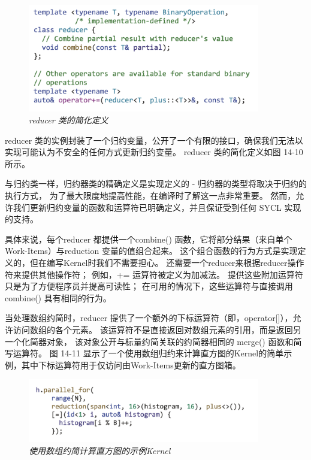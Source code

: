 \begin{figure}[H]
	\centering
	\includegraphics[width=0.9\textwidth]{figs/F14.10.png}
	\caption{\textit{reducer 类的简化定义 }}
\end{figure}

reducer 类的实例封装了一个归约变量，公开了一个有限的接口，确保我们无法以实现可能认为不安全的任何方式更新归约变量。 
reducer 类的简化定义如图 14-10 所示。

与归约类一样，归约器类的精确定义是实现定义的 - 归约器的类型将取决于归约的执行方式，
为了最大限度地提高性能，在编译时了解这一点非常重要。 
然而，允许我们更新归约变量的函数和运算符已明确定义，并且保证受到任何 SYCL 实现的支持。

具体来说，每个reducer 都提供一个combine() 函数，它将部分结果（来自单个Work-Items）与reduction 变量的值组合起来。 
这个组合函数的行为方式是实现定义的，但在编写Kernel时我们不需要担心。 
还需要一个reducer来根据reducer操作符来提供其他操作符； 
例如，+= 运算符被定义为加减法。 提供这些附加运算符只是为了方便程序员并提高可读性； 
在可用的情况下，这些运算符与直接调用combine() 具有相同的行为。

当处理数组约简时，reducer 提供了一个额外的下标运算符（即，operator[]），允许访问数组的各个元素。 
该运算符不是直接返回对数组元素的引用，而是返回另一个化简器对象，
该对象公开与标量约简关联的约简器相同的 merge() 函数和简写运算符。 
图 14-11 显示了一个使用数组归约来计算直方图的Kernel的简单示例，其中下标运算符用于仅访问由Work-Items更新的直方图箱。

\begin{figure}[H]
	\centering
	\includegraphics[width=0.9\textwidth]{figs/F14.11.png}
	\caption{\textit{使用数组约简计算直方图的示例Kernel }}
\end{figure}

